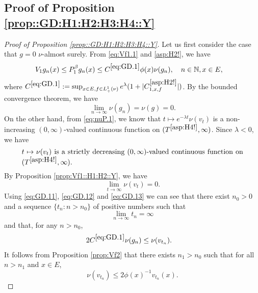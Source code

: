 \documentclass[12pt,a4paper]{amsart}
\numberwithin{equation}{section}
\theoremstyle{plain}
\theoremstyle{definition}
\theoremstyle{remark}
\begin{document}
\subsection{Proof of Proposition \ref{prop::GD:H1:H2:H3:H4::Y}}
\begin{proof}[Proof of Proposition \ref{prop::GD:H1:H2:H3:H4::Y}] \label{sec:GD}
	Let us first consider the case that $g = 0$ $\nu$-almost surely. 
	From \eqref{eq:Vf1.1} and \eqref{asp:H2!}, we have
\begin{align}\label{eq:GD.1}
	&V_1 g_n(x)
	\leq P^\beta_1 g_n(x)
	\leq C^{\eqref{eq:GD.1}} \phi(x) \nu(g_n),
	\quad n \in \mathbb N, x\in E,
\end{align}
	where $C^{\eqref{eq:GD.1}}:= \sup_{x\in E, f\in L_+^1(\nu)}e^{\lambda }(1+|C^{\eqref{asp:H2!}}_{1,x,f}|)$.
	By the bounded convergence theorem, we have
\begin{equation} \label{eq:GD.11}
	\lim_{n\to \infty} \nu(g_n) = \nu(g) = 0.
\end{equation}
	On the other hand, from \eqref{eq:nuP.1}, we know that $ t\mapsto e^{-\lambda t}\nu(v_t)$ is a non-increasing $(0,\infty)$-valued continuous function on $(T^{\eqref{asp:H4!}},\infty)$.
	Since $\lambda <0$, we have
\begin{equation} \label{eq:GD.12}
\begin{minipage}{0.9\textwidth}
	$ t\mapsto \nu(v_t)$ is a strictly decreasing $(0,\infty)$-valued continuous function on $(T^{\eqref{asp:H4!}},\infty)$.
\end{minipage}
\end{equation}
	By Proposition \ref{prop:Vf1::H1:H2::Y}, we have
\begin{equation} \label{eq:GD.13}
	\lim_{t\to \infty}\nu(v_t) =0.
\end{equation}
	Using \eqref{eq:GD.11}, \eqref{eq:GD.12} and \eqref{eq:GD.13} we can see that there exist $n_0>0$ and a sequence $\{t_n: n>n_0\}$ of positive numbers such that
\begin{equation} \label{eq:GD.14}
	\lim_{n\to \infty} t_n = \infty
\end{equation}
	and that, for any $n>n_0$,
\begin{align} \label{eq:GD.2}& 2C^{\eqref{eq:GD.1}} \nu(g_n) \leq \nu(v_{t_n}). \end{align}
	It follows from Proposition \ref{prop:Vf2} that there exists $n_1 > n_0$ such that for all $n>n_1$ and $x\in E$,
\begin{equation} \label{eq:GD.25}
	\nu(v_{t_n})\leq 2\phi(x)^{-1} v_{t_n}(x).
\end{equation}

\end{proof}
\end{document}

